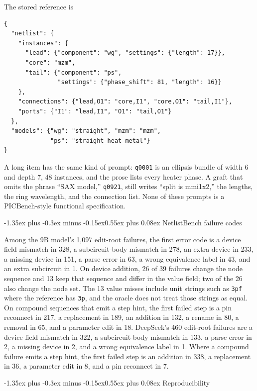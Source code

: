 \documentclass[11pt]{article}
\makeatletter
\renewcommand\section{\@startsection{section}{1}{\z@}%
  {-1.35ex plus -0.3ex minus -0.15ex}{0.55ex plus 0.08ex}%
  {\normalfont\large\bfseries}}
\makeatother
\begin{document}
The stored reference is

\begin{verbatim}
{
  "netlist": {
    "instances": {
      "lead": {"component": "wg", "settings": {"length": 17}},
      "core": "mzm",
      "tail": {"component": "ps",
               "settings": {"phase_shift": 81, "length": 16}}
    },
    "connections": {"lead,O1": "core,I1", "core,O1": "tail,I1"},
    "ports": {"I1": "lead,I1", "O1": "tail,O1"}
  },
  "models": {"wg": "straight", "mzm": "mzm",
             "ps": "straight_heat_metal"}
}
\end{verbatim}

A long item has the same kind of prompt: \texttt{q0001} is an ellipsis bundle of width 6 and depth 7, 48 instances, and the prose lists every heater phase.
A graft that omits the phrase ``SAX model,'' \texttt{q0921}, still writes ``split is mmi1x2,'' the lengths, the ring wavelength, and the connection list.
None of these prompts is a PICBench-style functional specification.

\section{NetlistBench failure codes}
\label{app:spice}

Among the 9B model's 1{,}097 edit-root failures, the first error code is a device field mismatch in 328, a subcircuit-body mismatch in 278, an extra device in 233, a missing device in 151, a parse error in 63, a wrong equivalence label in 43, and an extra subcircuit in 1.
On device addition, 26 of 39 failures change the node sequence and 13 keep that sequence and differ in the value field; two of the 26 also change the node set.
The 13 value misses include unit strings such as \texttt{3pf} where the reference has \texttt{3p}, and the oracle does not treat those strings as equal.
On compound sequences that emit a step hint, the first failed step is a pin reconnect in 217, a replacement in 189, an addition in 132, a rename in 80, a removal in 65, and a parameter edit in 18.
DeepSeek's 460 edit-root failures are a device field mismatch in 322, a subcircuit-body mismatch in 133, a parse error in 2, a missing device in 2, and a wrong equivalence label in 1.
Where a compound failure emits a step hint, the first failed step is an addition in 338, a replacement in 36, a parameter edit in 8, and a pin reconnect in 7.

\section{Reproducibility}
\label{app:repro}
\end{document}
